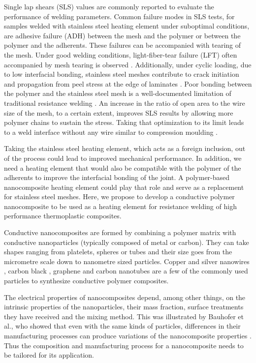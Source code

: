 \documentclass[11pt,review,times]{elsarticle}
\begin{document}
Single lap shears (SLS) values are commonly reported to evaluate the performance of welding parameters. 
Common failure modes in SLS tests, for samples welded with stainless steel heating element under suboptimal conditions, are adhesive failure (ADH) between the mesh and the polymer or between the polymer and the adherents. 
These failures can be accompanied with tearing of the mesh. 
Under good welding conditions, light-fiber-tear failure (LFT) often accompanied by mesh tearing is observed \cite{Shi2014}. 
Additionally, under cyclic loading, due to low interfacial bonding, stainless steel meshes contribute to crack initiation and propagation from peel stress at the edge of laminates \cite{Dube2009a}. 
Poor bonding between the polymer and the stainless steel mesh is a well-documented limitation of traditional resistance welding \cite{Dube2007,Dube2012a,Dube2009a,Shi2014,Shi2015a}. 
An increase in the ratio of open area to the wire size of the mesh, to a certain extent, improves SLS results by allowing more polymer chains to sustain the stress. 
Taking that optimization to its limit leads to a weld interface without any wire similar to compression moulding \cite{Dube2012a}. 

Taking the stainless steel heating element, which acts as a foreign inclusion, out of the process could lead to improved mechanical performance. 
In addition, we need a heating element that would also be compatible with the polymer of the adherents to improve the interfacial bonding of the joint. 
A polymer-based nanocomposite heating element could play that role and serve as a replacement for stainless steel meshes. 
Here, we propose to develop a conductive polymer nanocomposite to be used as a heating element for resistance welding of high performance thermoplastic composites. 

Conductive nanocomposites are formed by combining a polymer matrix with conductive nanoparticles (typically composed of metal or carbon). 
They can take shapes ranging from platelets, spheres or tubes and their size goes from the micrometre scale down to nanometre sized particles. 
Copper and silver nanowires \cite{Gelves2008a, Al-Saleh2011, Li2015a, Riviere2016}, carbon black \cite{Jin2013, MohdRadzuan2017}, graphene \cite{Jiang2012a, Hu2014a} and carbon nanotubes \cite{Diez-Pascual2011,Huegun2013,Kazakova2014,Jia2015} are a few of the commonly used particles to synthesize conductive polymer composites.

The electrical properties of nanocomposites depend, among other things, on the intrinsic properties of the nanoparticles, their mass fraction, surface treatments they have received and the mixing method. 
This was illustrated by Bauhofer et al., who showed that even with the same kinds of particles, differences in their manufacturing processes can produce variations of the nanocomposite properties \cite{Bauhofer2009}. 
Thus the composition and manufacturing process for a nanocomposite needs to be tailored for its application. 
\end{document}
